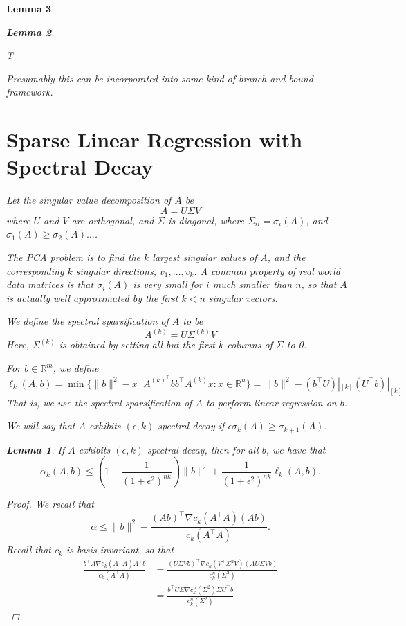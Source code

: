 \documentclass[a4paper]{article}
\newtheorem{lemma}{Lemma}
\newcommand{\R}{\mathbb{R}}
\begin{document}
\begin{lemma}
\begin{lemma}
\begin{algorithm}
\begin{algorithmic}
        \Return T
    \end{algorithmic}
\end{algorithm}
Presumably this can be incorporated into some kind of branch and bound framework.


\section{Sparse Linear Regression with Spectral Decay}
Let the singular value decomposition of $A$ be 
\[
    A = U\Sigma V
\]
where $U$ and $V$ are orthogonal, and $\Sigma$ is diagonal, where $\Sigma_{ii}  = \sigma_i(A)$, and $\sigma_1(A) \ge \sigma_2(A) \dots $.

The PCA problem is to find the $k$ largest singular values of $A$, and the corresponding $k$ singular directions, $v_1, \dots, v_k$.
A common property of real world data matrices is that $\sigma_i(A)$ is very small for $i$ much smaller than $n$, so that $A$ is actually well approximated by the first $k < n$ singular vectors.

We define the spectral sparsification of $A$ to be 
\[
    A^{(k)} = U\Sigma^{(k)}V
\]
Here, $\Sigma^{(k)}$ is obtained by setting all but the first $k$ columns of $\Sigma$ to 0.

For $b \in \R^m$, we define
\[
    \ell_k(A, b) = \min \{ \|b\|^2 - x^{\intercal} A^{(k)}^{\intercal}b b^{\intercal}A^{(k)}x : x \in \R^n\} =  \|b\|^2 - (b^{\intercal} U)|_{[k]}(U^{\intercal}b)|_{[k]}
\]
That is, we use the spectral sparsification of $A$ to perform linear regression on $b$.

We will say that $A$ exhibits $(\epsilon, k)$-spectral decay if $\epsilon \sigma_{k}(A) \ge \sigma_{k+1}(A)$.

\begin{lemma}
    If $A$ exhibits $(\epsilon, k)$ spectral decay, then for all $b$, we have that 
    \[
        \alpha_k(A, b) \le (1-\frac{1}{(1+\epsilon^2)^{nk}}) \|b\|^2 + \frac{1}{(1+\epsilon^2)^{nk}}\ell_k(A, b).
    \]
\end{lemma}
\begin{proof}
    We recall that 
    \[
        \alpha \le \|b\|^2 - \frac{(Ab)^{\intercal} \nabla c_k(A^{\intercal}A) (Ab)}{c_k(A^{\intercal}A)}.
    \]
    Recall that $c_k$ is basis invariant, so that 
    \begin{align*}
        \frac{b^{\intercal}A \nabla c_k(A^{\intercal}A) A^{\intercal}b}{c_k(A^{\intercal}A)} &= 
        \frac{(U\Sigma V b)^{\intercal} \nabla c_k(V^{\intercal}\Sigma^2V) (AU\Sigma Vb)}{c_k^n(\Sigma^2)}\\
                                                                                     &=\frac{b^{\intercal} U\Sigma \nabla c_k^n(\Sigma^2) \Sigma U^{\intercal}b}{c_k^n(\Sigma^2)}
    \end{align*}


\end{proof}
\end{lemma}
\end{lemma}
\end{document}
